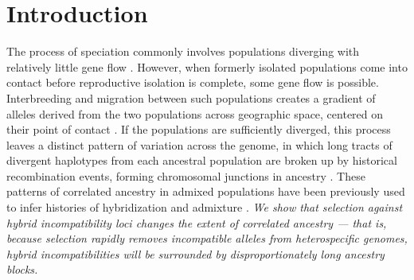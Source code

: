 \documentclass[11pt,letterpaper]{article}
\newcommand{\yb}[1]{{\em \color{magenta} #1}}
\begin{document}
\linenumbers
\doublespacing


\section*{Introduction}


The process of speciation commonly involves populations diverging with relatively little gene flow \citep{Coyne2004}.  
However, when formerly isolated populations come into contact before reproductive isolation is complete, some gene flow is possible.
Interbreeding and migration between such populations  
creates a gradient of alleles derived from the two populations across geographic space, %
centered on their point of contact \citep[reviewed in][]{Barton1985}. 
If the populations are sufficiently diverged, 
this process leaves a distinct pattern of variation across the genome, 
in which long tracts of divergent haplotypes from each ancestral population  
are broken up by historical recombination events,
forming chromosomal {junctions} in ancestry \citep{Fisher1954, Chapman2002, baird2003distribution}. 
These
patterns of correlated ancestry in admixed populations have been previously used to infer histories of hybridization and admixture \citep[e.g.][]{Gravel2012,Hellenthal2014,sedghifar2015spatial}.  
\yb{We show that selection against hybrid incompatibility loci changes the extent of correlated ancestry --- that is, 
because selection rapidly removes incompatible alleles from heterospecific genomes, hybrid incompatibilities will be surrounded by disproportionately long ancestry blocks.}


\end{document}
